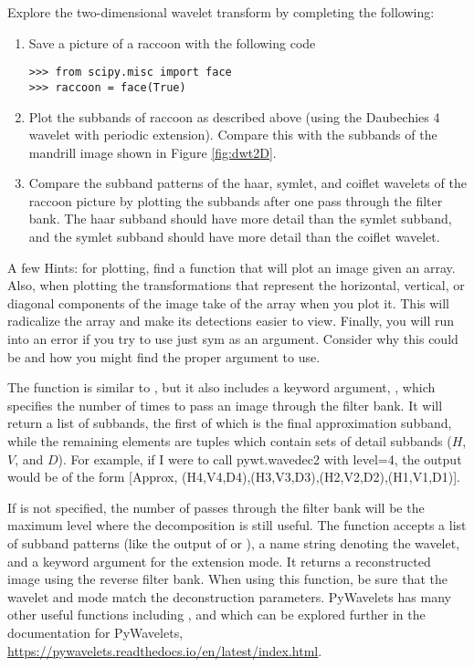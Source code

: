 \begin{problem}
Explore the two-dimensional wavelet transform by completing the following:
\begin{enumerate}
    \item Save a picture of a raccoon with the following code
\begin{lstlisting}
>>> from scipy.misc import face
>>> raccoon = face(True)
\end{lstlisting}
    \item Plot the subbands of raccoon as described above (using the Daubechies 4 wavelet with periodic extension).
        Compare this with the subbands of the mandrill image shown in Figure \ref{fig:dwt2D}.
    \item Compare the subband patterns of the haar, symlet, and coiflet wavelets of the raccoon picture by plotting the subbands after one pass through the filter bank.
    The haar subband should have more detail than the symlet subband, and the symlet subband should have more detail than the coiflet wavelet.
\end{enumerate}

A few Hints: for plotting, find a function that will plot an image given an array. Also, when plotting the transformations that represent the horizontal, vertical, or diagonal components of the image take  of the array when you plot it. This will radicalize the array and make its detections easier to view. Finally, you will run into an error if you try to use just {\textquotesingle}sym{\textquotesingle} as an argument. Consider why this could be and how you might find the proper argument to use.
\end{problem}

The function  is similar to , but it also includes a keyword argument, , which specifies the number of times to pass an image through the filter bank.
It will return a list of subbands, the first of which is the final approximation subband, while the remaining elements are tuples which contain sets of detail subbands ($H$, $V$, and $D$). For example, if I were to call pywt.wavedec2 with level=4, the output would be of the form [Approx, (H4,V4,D4),(H3,V3,D3),(H2,V2,D2),(H1,V1,D1)].

If  is not specified, the number of passes through the filter bank will be the maximum level where the decomposition is still useful.
The function  accepts a list of subband patterns (like the output of  or ), a name string denoting the wavelet, and a keyword argument
 for the extension mode.
It returns a reconstructed image using the reverse filter bank.
When using this function, be sure that the wavelet and mode match the deconstruction parameters.
PyWavelets has many other useful functions including ,  and  which can be explored further in the documentation for PyWavelets, \url{https://pywavelets.readthedocs.io/en/latest/index.html}.



